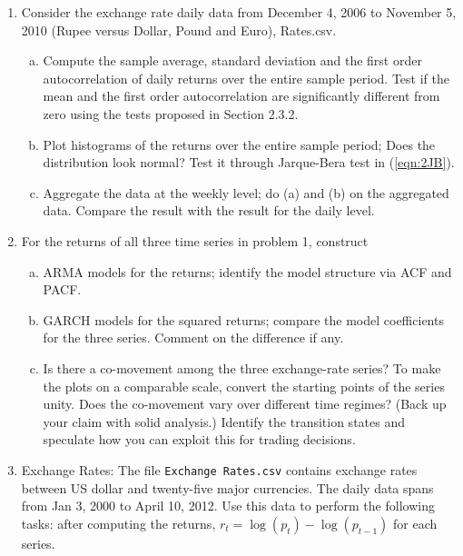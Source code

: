 \begin{enumerate}[1.]
\item Consider the exchange rate daily data from December 4, 2006 to November 5, 2010 (Rupee versus Dollar, Pound and Euro), Rates.csv.
\begin{enumerate}[(a)]
\item Compute the sample average, standard deviation and the first order autocorrelation of daily returns over the entire sample period.  Test if the mean and the first order autocorrelation are significantly different from zero using the tests proposed in Section 2.3.2. 

\item Plot histograms of the returns over the entire sample period; Does the distribution look normal?  Test it through Jarque-Bera test in (\ref{eqn:2JB}).

\item Aggregate the data at the weekly level; do (a) and (b) on the aggregated data. Compare the result with the result for the daily level.
\end{enumerate}

\item For the returns of all three time series in problem 1,  construct
\begin{enumerate}[(a)]
\item ARMA models for the returns; identify the model structure via ACF and PACF.

\item  GARCH models for the squared returns; compare the model coefficients for the three series.  Comment on the difference if any.

\item Is there a co-movement among the three exchange-rate series? To make the plots on a comparable scale, convert the starting points of the series unity. Does the co-movement vary over different time regimes? (Back up your claim with solid analysis.) Identify the transition states and speculate how you can exploit this for trading decisions. 
\end{enumerate}

\item Exchange Rates: The file \texttt{Exchange Rates.csv} contains exchange rates between US dollar and twenty-five major currencies. The daily data spans from Jan 3, 2000 to April 10, 2012. Use this data to perform the following tasks: after computing the returns, $r_t=\log(p_t)-\log(p_{t-1})$ for each series.


\end{enumerate}
